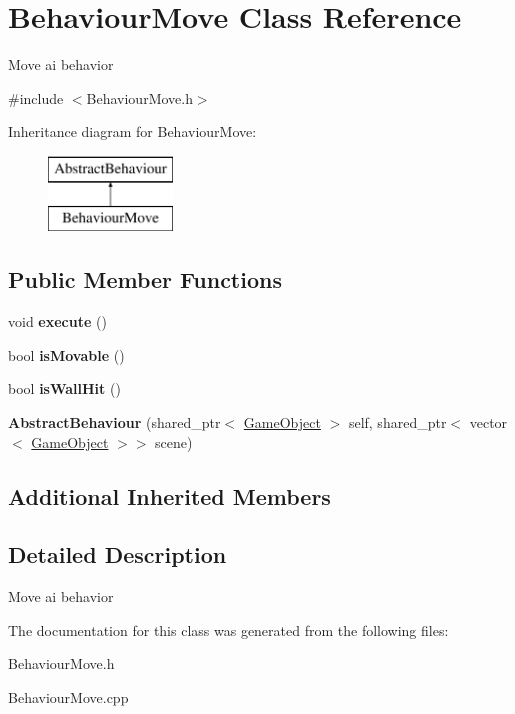 \hypertarget{class_behaviour_move}{}\section{Behaviour\+Move Class Reference}
\label{class_behaviour_move}


Move ai behavior  




{\ttfamily \#include $<$Behaviour\+Move.\+h$>$}

Inheritance diagram for Behaviour\+Move\+:\begin{figure}[H]
\begin{center}
\leavevmode
\includegraphics[height=2.000000cm]{class_behaviour_move}
\end{center}
\end{figure}
\subsection*{Public Member Functions}
\begin{DoxyCompactItemize}
\item 
\mbox{\label{class_behaviour_move_a4cccd6dbe5ccf37b1522fc71a807f080}} 
void {\bfseries execute} ()
\item 
\mbox{\label{class_behaviour_move_a3d4182913183e85af80a1eba69a457a1}} 
bool {\bfseries is\+Movable} ()
\item 
\mbox{\label{class_behaviour_move_aebfd734f768321735b20f4e66ea1faab}} 
bool {\bfseries is\+Wall\+Hit} ()
\item 
\mbox{\label{class_behaviour_move_a8a3a9217b3179f949a1d6a32f340c00c}} 
{\bfseries Abstract\+Behaviour} (shared\+\_\+ptr$<$ \mbox{\hyperlink{class_game_object}{Game\+Object}} $>$ self, shared\+\_\+ptr$<$ vector$<$ \mbox{\hyperlink{class_game_object}{Game\+Object}} $>$$>$ scene)
\end{DoxyCompactItemize}
\subsection*{Additional Inherited Members}


\subsection{Detailed Description}
Move ai behavior 



The documentation for this class was generated from the following files\+:\begin{DoxyCompactItemize}
\item 
Behaviour\+Move.\+h\item 
Behaviour\+Move.\+cpp\end{DoxyCompactItemize}
